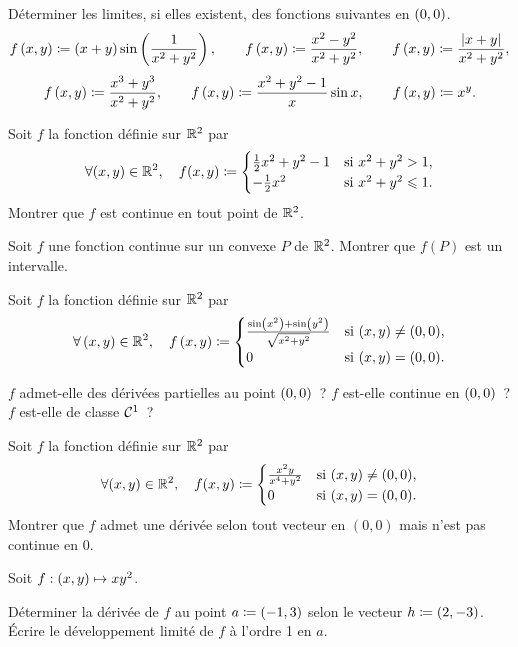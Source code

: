 \documentclass{magnolia}
\begin{document}

Déterminer les limites, si elles existent, des fonctions suivantes en $\left(0,0\right)$.
\[f\left(x,y\right)\coloneqq\left(x+y\right)\sin\left(\frac{1}{x^2+y^2}\right), \qquad
  f\left(x,y\right)\coloneqq\frac{x^2-y^2}{x^2+y^2}, \qquad
  f\left(x,y\right)\coloneqq\frac{\left|x+y\right|}{x^2+y^2},\]
\[f\left(x,y\right)\coloneqq\frac{x^3+y^3}{x^2+y^2}, \qquad
  f\left(x,y\right)\coloneqq\frac{x^2+y^2-1}{x}\sin x, \qquad
  f\left(x,y\right)\coloneqq x^y.\]

Soit $f$ la fonction définie sur $\mathbb{R}^2$ par
\[\forall (x,y)\in\mathbb{R}^2 ,\quad f(x,y)\coloneqq
  \begin{cases}
  \frac{1}{2}x^2+y^2-1 & \text{si $x^2+y^2>1$,}\\
  -\frac{1}{2}x^2 & \text{si $x^2+y^2\leqslant 1$.}
  \end{cases}
\]
Montrer que $f$ est continue en tout point de $\mathbb{R}^2$.

Soit $f$ une fonction continue sur un convexe $P$ de $\mathbb{R}^2$. Montrer que $f(P)$
est un intervalle.


Soit $f$ la fonction définie sur $\mathbb{R}^2$ par
\[\forall\left(x,y\right)\in\mathbb{R}^2 ,\quad
  f\left(x,y\right)\coloneqq
  \begin{cases}
  \frac{\sin\left(x^2\right)+\sin\left(y^2\right)}{\sqrt{x^2+y^2}} &
    \text{si $\left(x,y\right)\neq\left(0,0\right)$,}\\
  0 &  \text{si $\left(x,y\right)=\left(0,0\right)$.}
  \end{cases}\]
\begin{questions}
\question $f$ admet-elle des dérivées partielles au point $\left(0,0\right)$~?
\question $f$ est-elle continue en $\left(0,0\right)$~?
\question $f$ est-elle de classe $\mathcal{C}^{1}$~?   
\end{questions}

Soit $f$ la fonction définie sur $\mathbb{R}^2$ par
\[\forall (x,y)\in\mathbb{R}^2 ,\quad f(x,y)\coloneqq
  \begin{cases}
  \frac{x^2y}{x^4+y^2} & \text{si $(x,y)\not=(0,0)$,}\\
  0                    & \text{si $(x,y)=(0,0)$.}  
  \end{cases}\]
Montrer que $f$ admet une dérivée selon tout vecteur en $(0,0)$ mais n'est pas
continue en $0$.

Soit $f:\left(x,y\right)\mapsto xy^2$.
\begin{questions}
\question Déterminer la dérivée de $f$ au point $a\coloneqq \left(-1,3\right)$ selon le vecteur
  $h\coloneqq \left(2,-3\right)$.
\question Écrire le développement limité de $f$ à l'ordre 1 en $a$.
\end{questions}
\end{document}
